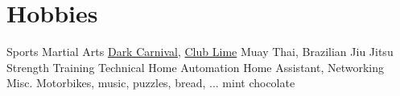 \documentclass[letterpaper]{twentysecondcv} %
\begin{document}
\section{Hobbies}
\begin{twenty}
	\twentyitem
    	{Sports}
		{}
        {Martial Arts}
        {\href{https://darkcarnival.com.au}{Dark Carnival}, \href{https://www.clublime.com.au}{Club Lime}}
        {Muay Thai, Brazilian Jiu Jitsu \\ Strength Training}
        {}
    \twentyitem
    	{Technical}
		{}
        {Home Automation}
        {}
        {Home Assistant, Networking}
        {}
    \twentyitem
    	{Misc.}
		{}
        {Motorbikes, music, puzzles, bread, ... mint chocolate}
        {}
        {}
        {}
\end{twenty}

\end{document}

